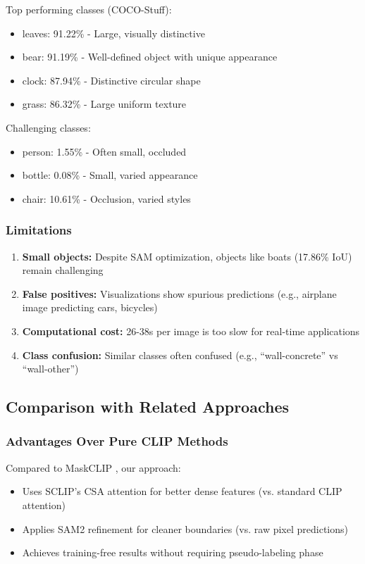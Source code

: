 Top performing classes (COCO-Stuff):
\begin{itemize}
    \item leaves: 91.22\% - Large, visually distinctive
    \item bear: 91.19\% - Well-defined object with unique appearance
    \item clock: 87.94\% - Distinctive circular shape
    \item grass: 86.32\% - Large uniform texture
\end{itemize}

Challenging classes:
\begin{itemize}
    \item person: 1.55\% - Often small, occluded
    \item bottle: 0.08\% - Small, varied appearance
    \item chair: 10.61\% - Occlusion, varied styles
\end{itemize}

\subsubsection{Limitations}

\begin{enumerate}
    \item \textbf{Small objects:} Despite SAM optimization, objects like boats (17.86\% IoU) remain challenging
    \item \textbf{False positives:} Visualizations show spurious predictions (e.g., airplane image predicting cars, bicycles)
    \item \textbf{Computational cost:} 26-38s per image is too slow for real-time applications
    \item \textbf{Class confusion:} Similar classes often confused (e.g., ``wall-concrete'' vs ``wall-other'')
\end{enumerate}

\subsection{Comparison with Related Approaches}

\subsubsection{Advantages Over Pure CLIP Methods}

Compared to MaskCLIP \cite{zhou2022extract}, our approach:
\begin{itemize}
    \item Uses SCLIP's CSA attention for better dense features (vs. standard CLIP attention)
    \item Applies SAM2 refinement for cleaner boundaries (vs. raw pixel predictions)
    \item Achieves training-free results without requiring pseudo-labeling phase
\end{itemize}

